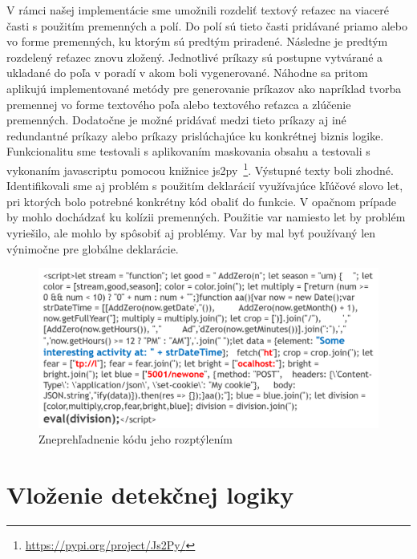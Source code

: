 \documentclass[conference, 11pt,slovak,a4paper,twoside]{IEEEtran}
\begin{document}
V rámci našej implementácie sme umožnili rozdeliť textový reťazec na viaceré časti s použitím premenných a polí. Do polí sú tieto časti pridávané priamo alebo vo forme premenných, ku ktorým sú predtým priradené. Následne je predtým rozdelený reťazec znovu zložený. Jednotlivé príkazy sú postupne vytvárané a ukladané do poľa v poradí v akom boli vygenerované. Náhodne sa pritom aplikujú implementované metódy pre generovanie príkazov ako napríklad tvorba premennej vo forme textového poľa alebo textového reťazca a zlúčenie premenných. Dodatočne je možné pridávať medzi tieto príkazy aj iné redundantné príkazy alebo príkazy prislúchajúce ku konkrétnej biznis logike. Funkcionalitu sme testovali s aplikovaním maskovania obsahu a testovali s vykonaním javascriptu pomocou knižnice js2py~\footnote{\url{https://pypi.org/project/Js2Py/}}. Výstupné texty boli zhodné. Identifikovali sme aj problém s použitím deklarácií využívajúce kľúčové slovo let, pri ktorých bolo potrebné konkrétny kód obaliť do funkcie. V opačnom prípade by mohlo dochádzať ku kolízii premenných. Použitie var namiesto let by problém vyriešilo, ale mohlo by spôsobiť aj problémy. Var by mal byť používaný len výnimočne pre globálne deklarácie. 


\begin{figure}[!t]  %
					\begin{center}
									\includegraphics[width=\linewidth]{fig/codeScattering.png}
									\caption{Zneprehľadnenie kódu jeho rozptýlením}
									\label{codeScattering}
					\end{center}
\end{figure}



\section{Vloženie detekčnej logiky}
\end{document}
